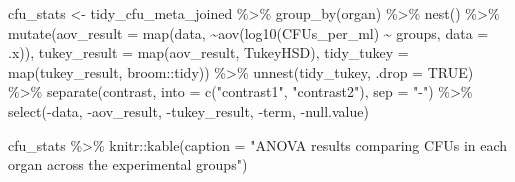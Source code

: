 \documentclass[
]{book}
\newenvironment{Shaded}{\begin{snugshade}}{\end{snugshade}}
\newcommand{\AttributeTok}[1]{\textcolor[rgb]{0.77,0.63,0.00}{#1}}
\newcommand{\ConstantTok}[1]{\textcolor[rgb]{0.00,0.00,0.00}{#1}}
\newcommand{\FunctionTok}[1]{\textcolor[rgb]{0.00,0.00,0.00}{#1}}
\newcommand{\NormalTok}[1]{#1}
\newcommand{\OtherTok}[1]{\textcolor[rgb]{0.56,0.35,0.01}{#1}}
\newcommand{\SpecialCharTok}[1]{\textcolor[rgb]{0.00,0.00,0.00}{#1}}
\newcommand{\StringTok}[1]{\textcolor[rgb]{0.31,0.60,0.02}{#1}}
\begin{document}
\begin{Shaded}
\begin{Highlighting}[]
\NormalTok{cfu\_stats }\OtherTok{\textless{}{-}}\NormalTok{ tidy\_cfu\_meta\_joined }\SpecialCharTok{\%\textgreater{}\%} 
  \FunctionTok{group\_by}\NormalTok{(organ) }\SpecialCharTok{\%\textgreater{}\%}
  \FunctionTok{nest}\NormalTok{() }\SpecialCharTok{\%\textgreater{}\%}
  \FunctionTok{mutate}\NormalTok{(}\AttributeTok{aov\_result =} \FunctionTok{map}\NormalTok{(data, }\SpecialCharTok{\textasciitilde{}}\FunctionTok{aov}\NormalTok{(}\FunctionTok{log10}\NormalTok{(CFUs\_per\_ml) }\SpecialCharTok{\textasciitilde{}}\NormalTok{ groups, }\AttributeTok{data =}\NormalTok{ .x)),}
         \AttributeTok{tukey\_result =} \FunctionTok{map}\NormalTok{(aov\_result, TukeyHSD),}
         \AttributeTok{tidy\_tukey =} \FunctionTok{map}\NormalTok{(tukey\_result, broom}\SpecialCharTok{::}\NormalTok{tidy)) }\SpecialCharTok{\%\textgreater{}\%}
  \FunctionTok{unnest}\NormalTok{(tidy\_tukey, }\AttributeTok{.drop =} \ConstantTok{TRUE}\NormalTok{) }\SpecialCharTok{\%\textgreater{}\%}
  \FunctionTok{separate}\NormalTok{(contrast, }\AttributeTok{into =} \FunctionTok{c}\NormalTok{(}\StringTok{"contrast1"}\NormalTok{, }\StringTok{"contrast2"}\NormalTok{), }\AttributeTok{sep =} \StringTok{"{-}"}\NormalTok{) }\SpecialCharTok{\%\textgreater{}\%}
  \FunctionTok{select}\NormalTok{(}\SpecialCharTok{{-}}\NormalTok{data, }\SpecialCharTok{{-}}\NormalTok{aov\_result, }\SpecialCharTok{{-}}\NormalTok{tukey\_result, }\SpecialCharTok{{-}}\NormalTok{term, }\SpecialCharTok{{-}}\NormalTok{null.value)}

\NormalTok{cfu\_stats }\SpecialCharTok{\%\textgreater{}\%} 
\NormalTok{  knitr}\SpecialCharTok{::}\FunctionTok{kable}\NormalTok{(}\AttributeTok{caption =} \StringTok{"ANOVA results comparing CFUs in each organ across the experimental groups"}\NormalTok{)}
\end{Highlighting}
\end{Shaded}
\end{document}
